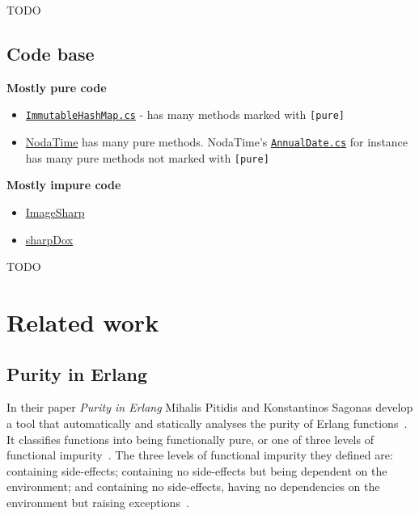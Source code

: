 \documentclass[a4paper,12pt]{article}
\begin{document}
TODO

\subsection{Code base} \label{sub:Code base}
\textbf{Mostly pure code}
\begin{itemize}
  \item \href{https://github.com/dotnet/roslyn/blob/master/src/Workspaces/SharedUtilitiesAndExtensions/Compiler/Core/Utilities/CompilerUtilities/ImmutableHashMap.cs}{\texttt{ImmutableHashMap.cs}} - has many methods marked with \texttt{[pure]}
  \item \href{https://github.com/nodatime/nodatime/blob/master/src/NodaTime}{NodaTime} has many pure methods. NodaTime's \href{https://github.com/nodatime/nodatime/blob/master/src/NodaTime/AnnualDate.cs}{\texttt{AnnualDate.cs}} for instance has many pure methods not marked with \texttt{[pure]}
\end{itemize}

\textbf{Mostly impure code}
\begin{itemize}
  \item \href{https://github.com/SixLabors/ImageSharp/blob/master/src/ImageSharp}{ImageSharp}
  \item \href{https://github.com/geaz/sharpDox}{sharpDox}
\end{itemize}

TODO

\section{Related work} \label{sec:Related work} %

\subsection{Purity in Erlang} \label{sub:Purity-in-Erlang}
In their paper \textit{Purity in Erlang} Mihalis Pitidis and Konstantinos Sagonas develop a tool that automatically and statically analyses the purity of Erlang functions~\cite{pitidis2010purity}. It classifies functions into being functionally pure, or one of three levels of functional impurity~\cite{pitidis2010purity}.
The three levels of functional impurity they defined are: containing side-effects; containing no side-effects but being dependent on the environment; and containing no side-effects, having no dependencies on the environment but raising exceptions~\cite{pitidis2010purity}.
\end{document}
